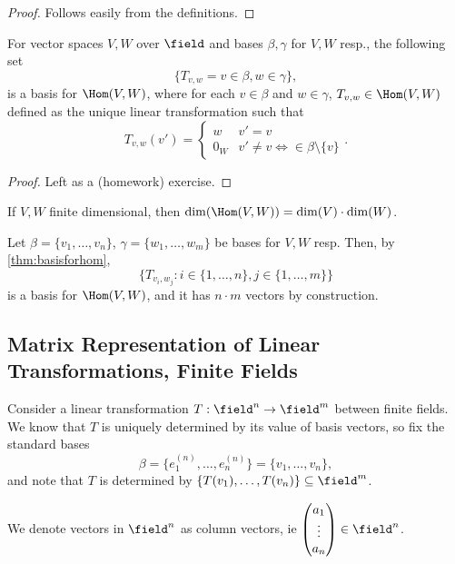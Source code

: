 \begin{proof}
    Follows easily from the definitions.
\end{proof}

\begin{theorem}\label{thm:basisforhom}
    For vector spaces $V, W$ over $\field$ and bases $\beta, \gamma$ for $V, W$ resp., the following set \[
    \{T_{v, w} = v \in \beta, w \in \gamma\},
    \]
    is a basis for $\Hom(V, W)$, where for each $v \in \beta$ and $w \in \gamma$, $T_{v, w} \in \Hom(V, W)$ defined as the unique linear transformation such that $$T_{v, w} (v') = \begin{cases}
        w & v' = v\\
        0_W & v' \neq v \iff \in \beta \setminus \{v\}
    \end{cases}.$$
\end{theorem}

\begin{proof}
    Left as a (homework) exercise.
\end{proof}



\begin{corollary}
        If $V, W$ finite dimensional, then $\dim(\Hom(V, W)) = \dim(V) \cdot \dim(W)$.
\end{corollary}

\begin{proposition}\label{prop:construction}
    Let $\beta = \{v_1, \dots, v_n\}$, $\gamma = \{w_1, \dots, w_m\}$ be bases for $V, W$ resp. Then, by \cref{thm:basisforhom}, \[
        \{T_{v_i, w_j} : i \in \{1, \dots, n\}, j \in \{1, \dots, m\}\}
    \]
    is a basis for $\Hom(V, W)$, and it has $n \cdot m$ vectors by construction.
\end{proposition}

\subsection{Matrix Representation of Linear Transformations, Finite Fields}

Consider a linear transformation $T : \field^n \to \field^m$ between finite fields. We know that $T$ is uniquely determined by its value of basis vectors, so fix the standard bases \[
\beta = \{e_1^{(n)}, \dots, e_n^{(n)}\}=\{v_1, \dots, v_n\},
\]
and note that $T$ is determined by $\{T(v_1), \dots, T(v_n)\} \subseteq \field^m$. 

\begin{remark}
    We denote vectors in $\field^n$ as column vectors, ie $\begin{pmatrix}
        a_1\\
        \vdots\\
        a_n
    \end{pmatrix} \in \field^n$.
\end{remark}

